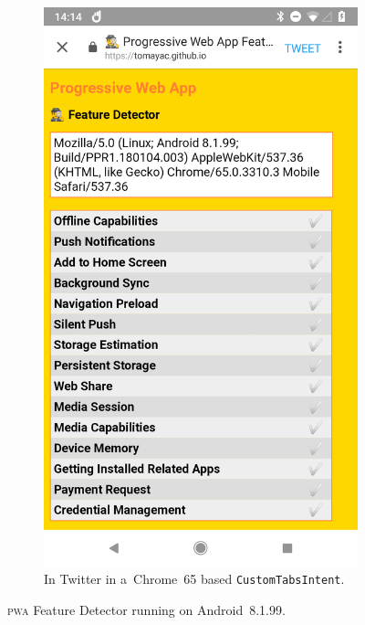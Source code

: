 \documentclass[sigconf]{acmart}
\begin{document}
\begin{figure}[t]
\begin{subfigure}[t]{0.475\columnwidth}
    \includegraphics[width=1\columnwidth,frame]{pwa-feature-detector-twitter-android-chrome65}
    \caption[\textsc{pwa} Feature Detector running in Twitter.]{
      In Twitter in a~Chrome~65 based \texttt{CustomTabsIntent}.}
    \label{fig:twitter-android-chrome65}
  \end{subfigure}
  \caption{\textsc{pwa} Feature Detector running on Android~8.1.99.}    
\end{figure}
\end{document}
